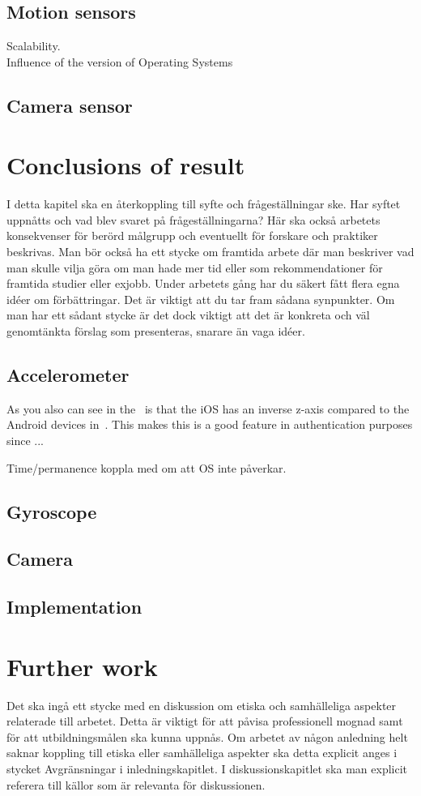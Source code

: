 \subsection{Motion sensors}
Scalability.\\
Influence of the version of Operating Systems \\

\subsection{Camera sensor}


\section{Conclusions of result}\label{sec:conclusion}
I detta kapitel ska en återkoppling till syfte och frågeställningar ske. Har syftet uppnåtts
och vad blev svaret på frågeställningarna? Här ska också arbetets konsekvenser för
berörd målgrupp och eventuellt för forskare och praktiker beskrivas.
Man bör också ha ett stycke om framtida arbete där man beskriver vad man skulle vilja
göra om man hade mer tid eller som rekommendationer för framtida studier eller exjobb.
Under arbetets gång har du säkert fått flera egna idéer om förbättringar. Det är viktigt att
du tar fram sådana synpunkter. Om man har ett sådant stycke är det dock viktigt att det är
konkreta och väl genomtänkta förslag som presenteras, snarare än vaga idéer.
\subsection{Accelerometer}
As you also can see in the~ is that the iOS has an inverse z-axis compared to the Android devices in~. This makes this is a good feature in authentication purposes since ...

Time/permanence koppla med \cite{sensor:accelPrint} om att OS inte påverkar.
\subsection{Gyroscope}
\subsection{Camera}
\subsection{Implementation}

\section{Further work}
Det ska ingå ett stycke med en diskussion om etiska och samhälleliga aspekter relaterade
till arbetet. Detta är viktigt för att påvisa professionell mognad samt för att utbildningsmålen
ska kunna uppnås. Om arbetet av någon anledning helt saknar koppling till etiska eller
samhälleliga aspekter ska detta explicit anges i stycket Avgränsningar i inledningskapitlet.
I diskussionskapitlet ska man explicit referera till källor som är relevanta för diskussionen.
